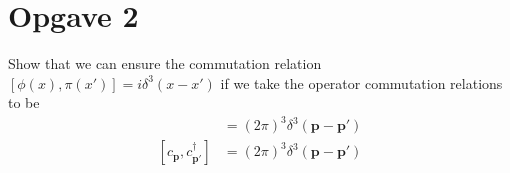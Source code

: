 \documentclass[working, oneside]{../../Preambles/tuftebook}
\begin{document}
\let\cleardoublepage\clearpage
\thispagestyle{fancy}
\chapter{Opgave 2}



\begin{exercise}[2.6]
Show that we can ensure the commutation relation $[\phi(x), \pi(x')] = i\delta^3(x - x')$ if we take the operator commutation relations to be
\begin{align*}
[a_{\mathbf{p}}, a_{\mathbf{p'}}^{\dagger}] &= (2\pi)^3 \delta^3(\mathbf{p} - \mathbf{p'}) \\
[c_{\mathbf{p}}, c_{\mathbf{p'}}^{\dagger}] &= (2\pi)^3 \delta^3(\mathbf{p} - \mathbf{p'})
\end{align*}
\end{exercise}
\end{document}
